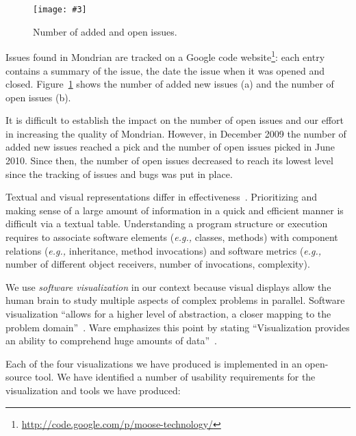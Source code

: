 \documentclass[runningheads]{llncs}
\newcommand{\fig}[4]{
	\begin{figure}[#1]
		\centering
		\texttt{[image: \#3]}
		\caption{\label{fig:#3}#4}
	\end{figure}}
\newcommand{\eg}{\emph{e.g.,}\xspace}
\newcommand{\figref}[1]{Figure~\ref{fig:#1}}
\begin{document}
\fig{}{0.9}{Retrospective}{Number of added and open issues.}

Issues found in Mondrian are tracked on a Google code website\footnote{\url{http://code.google.com/p/moose-technology/}}: each entry contains a summary of the issue, the date the issue when it was opened and closed.
\figref{Retrospective} shows the number of added new issues (a) and the number of open issues (b).  

It is difficult to establish the impact on the number of open issues and our effort in increasing the quality of Mondrian. However, in December 2009 the number of added new issues reached a pick and the number of open issues picked in June 2010. Since then, the number of open issues decreased to reach its lowest level since the tracking of issues and bugs was put in place.

Textual and visual representations differ in effectiveness~\cite{Petr95a}. 
Prioritizing and making sense of a large amount of information in a quick and efficient manner is difficult via a textual table. Understanding a program structure or execution requires to associate software elements (\eg classes, methods) with component relations (\eg inheritance, method invocations) and software metrics (\eg number of different object receivers, number of invocations, complexity). 

We use \emph{software visualization} in our context because visual displays allow the human brain to study multiple aspects of complex problems in parallel. Software visualization ``allows for a higher level of abstraction, a closer mapping to the problem domain''~\cite{Petr95a}. Ware emphasizes this point by stating ``Visualization provides an ability to comprehend huge amounts of data''~\cite{Ware00a}. 

Each of the four visualizations we have produced is implemented in an open-source tool.  %
We have identified a number of usability requirements for the visualization and tools we have produced:
\end{document}

